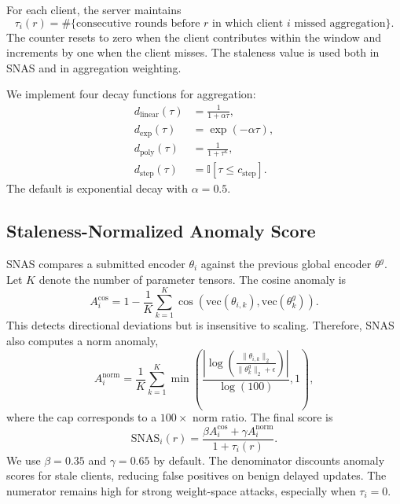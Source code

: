 \documentclass[pdflatex,sn-mathphys-num]{sn-jnl}
\begin{document}
For each client, the server maintains
\begin{equation}
\tau_i(r) = \#\{\text{consecutive rounds before }r\text{ in which client }i\text{ missed aggregation}\}.
\end{equation}
The counter resets to zero when the client contributes within the window and increments by one when the client misses. The staleness value is used both in SNAS and in aggregation weighting.

We implement four decay functions for aggregation:
\begin{align}
    d_{\mathrm{linear}}(\tau) &= \frac{1}{1+\alpha\tau}, \\
    d_{\mathrm{exp}}(\tau) &= \exp(-\alpha\tau), \\
    d_{\mathrm{poly}}(\tau) &= \frac{1}{1+\tau^\kappa}, \\
    d_{\mathrm{step}}(\tau) &= \mathbb{I}[\tau \leq c_{\mathrm{step}}].
\end{align}
The default is exponential decay with $\alpha=0.5$.

\subsection{Staleness-Normalized Anomaly Score}

SNAS compares a submitted encoder $\theta_i$ against the previous global encoder $\theta^g$. Let $K$ denote the number of parameter tensors. The cosine anomaly is
\begin{equation}
    A^{\mathrm{cos}}_i = 1 - \frac{1}{K}\sum_{k=1}^{K}\cos\left(\mathrm{vec}(\theta_{i,k}),\mathrm{vec}(\theta^g_{k})\right).
\end{equation}
This detects directional deviations but is insensitive to scaling. Therefore, SNAS also computes a norm anomaly,
\begin{equation}
    A^{\mathrm{norm}}_i = \frac{1}{K}\sum_{k=1}^{K}\min\left(\frac{\left|\log\left(\frac{\|\theta_{i,k}\|_2}{\|\theta^g_k\|_2+\epsilon}\right)\right|}{\log(100)},1\right),
\end{equation}
where the cap corresponds to a $100\times$ norm ratio. The final score is
\begin{equation}
    \mathrm{SNAS}_i(r)=\frac{\beta A^{\mathrm{cos}}_i + \gamma A^{\mathrm{norm}}_i}{1+\tau_i(r)}.
\end{equation}
We use $\beta=0.35$ and $\gamma=0.65$ by default. The denominator discounts anomaly scores for stale clients, reducing false positives on benign delayed updates. The numerator remains high for strong weight-space attacks, especially when $\tau_i=0$.
\end{document}
